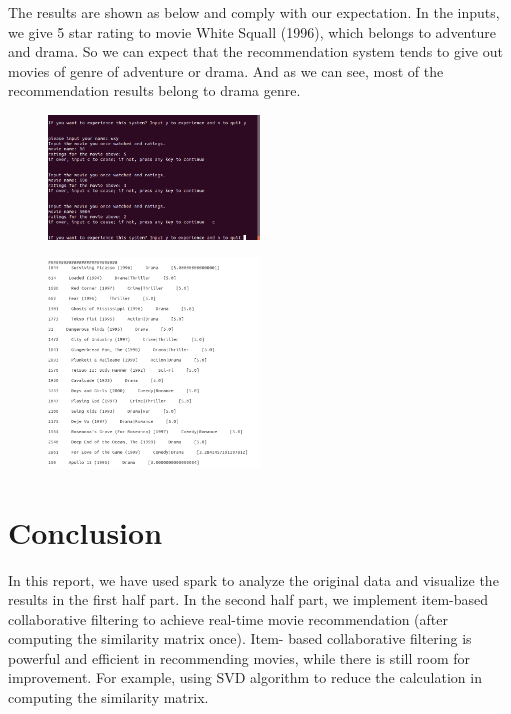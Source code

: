 \documentclass[two column]{article}
\begin{document}
\par The results are shown as below and comply with our expectation. In the inputs, we give 5 star rating to movie White Squall (1996), which belongs to adventure and drama. So we can expect that the recommendation system tends to give out movies of genre of adventure or drama. And as we can see, most of the recommendation results belong to drama genre.

\begin{figure}[H]
\centering
\includegraphics[width=0.5\textwidth]{new-user.png}
\end{figure}

\begin{figure}[H]
\centering
\includegraphics[width=0.5\textwidth]{new-user1.png}
\end{figure}


\section{Conclusion}
\par In this report, we have used spark to analyze the original data and visualize the results in the first half part. In the second half part, we implement item-based collaborative filtering to achieve real-time movie recommendation (after computing the similarity matrix once). Item- based collaborative filtering is powerful and efficient in recommending movies, while there is still room for improvement. For example, using SVD algorithm to reduce the calculation in computing the similarity matrix. 
\end{document}
